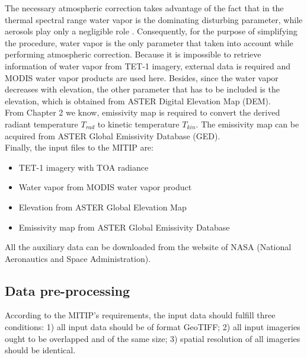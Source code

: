 \noindent The necessary atmospheric correction takes advantage of the fact that in the thermal spectral range water vapor is the dominating disturbing parameter, while aerosols play only a negligible role \parencite{Reference204}. Consequently, for the purpose of simplifying the procedure, water vapor is the only parameter that taken into account while performing atmospheric correction. Because it is impossible to retrieve information of water vapor from TET-1 imagery, external data is required and MODIS water vapor products are used here. Besides, since the water vapor decreases with elevation, the other parameter that has to be included is the elevation, which is obtained from ASTER Digital Elevation Map (DEM).\\

\noindent From Chapter 2 we know, emissivity map is required to convert the derived radiant temperature $T_{rad}$ to kinetic temperature $T_{kin}$. The emissivity map can be acquired from ASTER Global Emissivity Database (GED).\\

\noindent Finally, the input files to the MITIP are:
\begin{itemize}
\item TET-1 imagery with TOA radiance
\item Water vapor from MODIS water vapor product
\item Elevation from ASTER Global Elevation Map
\item Emissivity map from ASTER Global Emissivity Database
\end{itemize}

\noindent All the auxiliary data can be downloaded from the website of NASA (National Aeronautics and Space Administration).\\


\subsection{Data pre-processing}
According to the MITIP's requirements, the input data should fulfill three conditions: 1) all input data should be of format GeoTIFF; 2) all input imageries ought to be overlapped and of the same size; 3) spatial resolution of all imageries should be identical.\\

